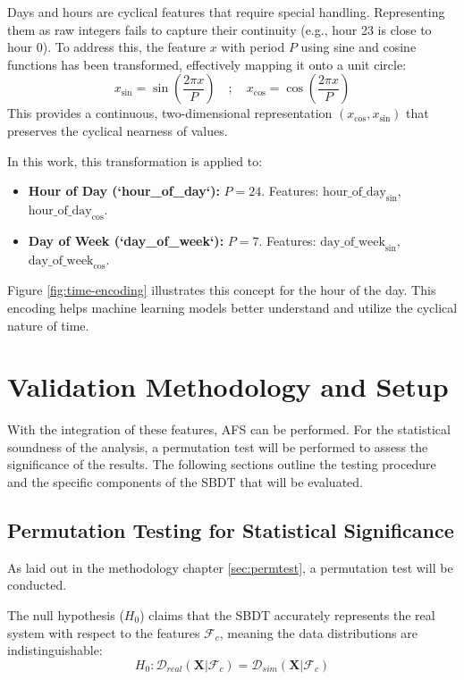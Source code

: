Days and hours are cyclical features that require special handling. Representing them as raw integers fails to capture their continuity (e.g., hour 23 is close to hour 0). To address this, the feature $x$ with period $P$ using sine and cosine functions has been transformed, effectively mapping it onto a unit circle:
\begin{equation}
    x_{\sin} = \sin\left(\frac{2 \pi x}{P}\right) \quad ; \quad
    x_{\cos} = \cos\left(\frac{2 \pi x}{P}\right)
    \label{eq:sincos_transform}
\end{equation}
This provides a continuous, two-dimensional representation $(x_{\cos}, x_{\sin})$ that preserves the cyclical nearness of values.

In this work, this transformation is applied to:

\begin{itemize}
    \item \textbf{Hour of Day (`hour\_of\_day`):} $P=24$. Features: $\text{hour\_of\_day}_{\sin}$, $\text{hour\_of\_day}_{\cos}$.
    \item \textbf{Day of Week (`day\_of\_week`):} $P=7$. Features: $\text{day\_of\_week}_{\sin}$, $\text{day\_of\_week}_{\cos}$.
\end{itemize}

Figure \ref{fig:time-encoding} illustrates this concept for the hour of the day. This encoding helps machine learning models better understand and utilize the cyclical nature of time.

\section{Validation Methodology and Setup}
With the integration of these features, AFS can be performed. For the statistical soundness of the analysis, a permutation test will be performed to assess the significance of the results. The following sections outline the testing procedure and the specific components of the SBDT that will be evaluated.

\subsection*{Permutation Testing for Statistical Significance}
\label{sec:model-logic}

As laid out in the methodology chapter \autoref{sec:permtest}, a permutation test will be conducted.

\noindent The null hypothesis ($H_0$) claims that the SBDT accurately represents the real system with respect to the features $\mathcal{F}_c$, meaning the data distributions are indistinguishable:
\begin{equation}
    H_0: \mathcal{D}_{real}(\mathbf{X} | \mathcal{F}_c) = \mathcal{D}_{sim}(\mathbf{X} | \mathcal{F}_c)
    \label{eq:h0}
\end{equation}


